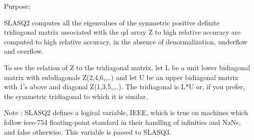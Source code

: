  \begin{DoxyParagraph}{Purpose\+: }
\begin{DoxyVerb} SLASQ2 computes all the eigenvalues of the symmetric positive 
 definite tridiagonal matrix associated with the qd array Z to high
 relative accuracy are computed to high relative accuracy, in the
 absence of denormalization, underflow and overflow.

 To see the relation of Z to the tridiagonal matrix, let L be a
 unit lower bidiagonal matrix with subdiagonals Z(2,4,6,,..) and
 let U be an upper bidiagonal matrix with 1's above and diagonal
 Z(1,3,5,,..). The tridiagonal is L*U or, if you prefer, the
 symmetric tridiagonal to which it is similar.

 Note : SLASQ2 defines a logical variable, IEEE, which is true
 on machines which follow ieee-754 floating-point standard in their
 handling of infinities and NaNs, and false otherwise. This variable
 is passed to SLASQ3.\end{DoxyVerb}
 
\end{DoxyParagraph}

